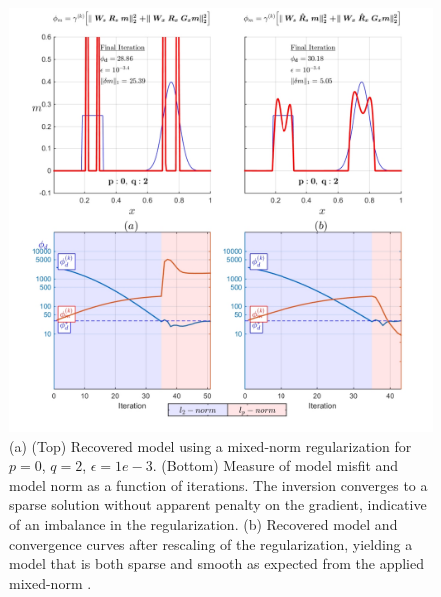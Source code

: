 \begin{figure}[p]
\centering
\includegraphics[scale=0.6]{1D_Eta_test}
\caption{(a) (Top) Recovered model using a mixed-norm regularization for $p=0$, $q=2$, $\epsilon=1e-3$. (Bottom) Measure of model misfit and model norm as a function of iterations. The inversion converges to a sparse solution without apparent penalty on the gradient, indicative of an imbalance in the regularization. (b) Recovered model and convergence curves after rescaling of the regularization, yielding a model that is both sparse and smooth as expected from the applied mixed-norm .}
\label{fig:1D_Eta_test}
\end{figure}

